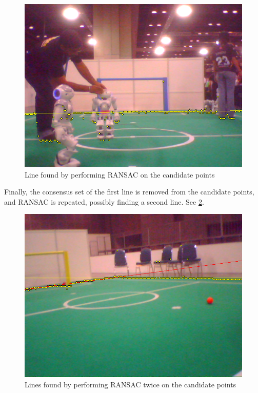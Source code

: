 \documentclass[runningheads,a4paper]{llncs}
\begin{document}
\begin{figure}
\centering
\includegraphics[width=1.0\textwidth]{figures/EdgeDetection_OneLinePointsAndLine}
\caption{Line found by performing RANSAC on the candidate points} \label{fig:EdgeDetection_OneLinePointsAndLine}
\end{figure}

Finally, the consensus set of the first line is removed from the candidate points, and RANSAC is repeated, possibly finding a second line. See \ref{fig:EdgeDetection_TwoLines}.

\begin{figure} [t]
\centering
\includegraphics[width=1.0\textwidth]{figures/EdgeDetection_TwoLines}
\caption{Lines found by performing RANSAC twice on the candidate points} \label{fig:EdgeDetection_TwoLines}
\end{figure}
\end{document}

